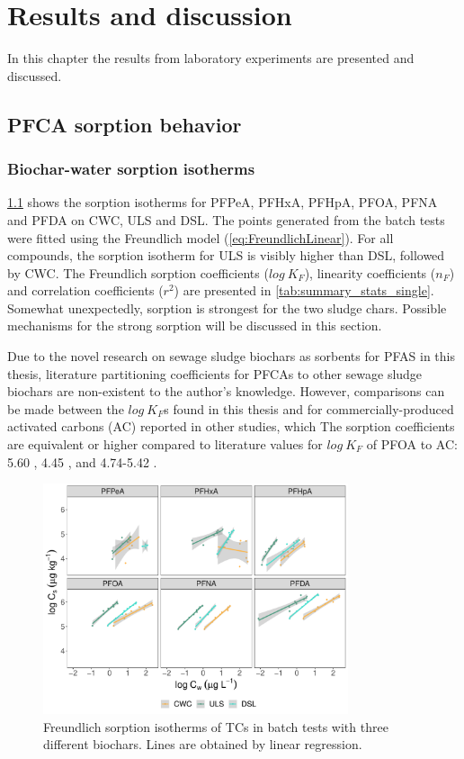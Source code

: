 \chapter{Results and discussion}\label{chap:Results&Disc}
In this chapter the results from laboratory experiments are presented and discussed.

\section{PFCA sorption behavior}
\subsection{Biochar-water sorption isotherms}
\cref{fig:sorption_isotherms} shows the sorption isotherms for PFPeA, PFHxA, PFHpA, PFOA, PFNA and PFDA on CWC, ULS and DSL. The points generated from the batch tests were fitted using the Freundlich model (\cref{eq:FreundlichLinear}). For all compounds, the sorption isotherm for ULS is visibly higher than DSL, followed by CWC. The Freundlich sorption coefficients ($log~K_F$), linearity coefficients ($n_F$) and correlation coefficients ($r^2$) are presented in \cref{tab:summary_stats_single}. Somewhat unexpectedly, sorption is strongest for the two sludge chars. Possible mechanisms for the strong sorption will be discussed in this section. 

Due to the novel research on sewage sludge biochars as sorbents for PFAS in this thesis, literature partitioning coefficients for PFCAs to other sewage sludge biochars are non-existent to the author's knowledge. However, comparisons can be made between the $log~K_F$s found in this thesis and for commercially-produced activated carbons (AC) reported in other studies, which  The sorption coefficients are equivalent or higher compared to literature values for $log~K_F$ of PFOA to AC: 5.60 \citep{Kupryianchyk2016a}, 4.45 \citep{hansen2010sorption}, and 4.74-5.42 \citep{silvani2019can}.

\begin{figure}[tb]
    \centering
    \includegraphics[width=0.8\textwidth]{R/figs/Sorption_isotherms_single_BC.pdf}
    \caption{Freundlich sorption isotherms of TCs in batch tests with three different biochars. Lines are obtained by linear regression.}
    \label{fig:sorption_isotherms}
\end{figure}

